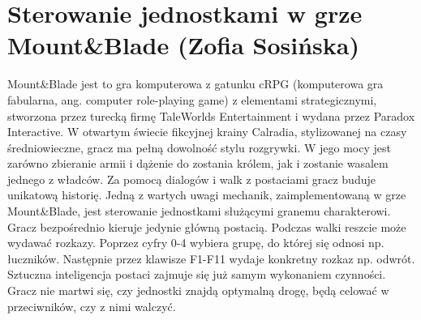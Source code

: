 \section{Sterowanie jednostkami w grze Mount\&Blade (Zofia Sosińska)}\label{chap:mb}

Mount\&Blade jest to gra komputerowa z gatunku cRPG (komputerowa gra fabularna, ang. computer role-playing game) z elementami strategicznymi, stworzona przez turecką firmę TaleWorlds Entertainment i wydana przez Paradox Interactive. W otwartym świecie fikcyjnej krainy Calradia, stylizowanej na czasy średniowieczne, gracz ma pełną dowolność stylu rozgrywki. W jego mocy jest zarówno zbieranie armii i dążenie do zostania królem, jak i zostanie wasalem jednego z władców. Za pomocą dialogów i walk z postaciami gracz buduje unikatową historię.
Jedną z wartych uwagi mechanik, zaimplementowaną w grze Mount\&Blade, jest sterowanie jednostkami służącymi granemu charakterowi. Gracz bezpośrednio kieruje jedynie główną postacią. Podczas walki reszcie może wydawać rozkazy. Poprzez cyfry 0-4 wybiera grupę, do której się odnosi np. łuczników. Następnie przez klawisze F1-F11 wydaje konkretny rozkaz np. odwrót. Sztuczna inteligencja postaci zajmuje się już samym wykonaniem czynności. Gracz nie martwi się, czy jednostki znajdą optymalną drogę, będą celować w przeciwników, czy z nimi walczyć.

